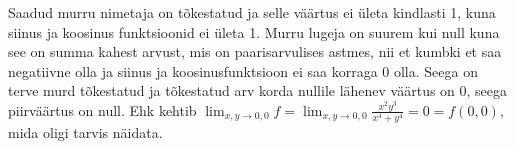 \documentclass{article}
\begin{document}
Saadud murru nimetaja on tõkestatud ja selle väärtus ei ületa kindlasti 1, kuna siinus ja koosinus funktsioonid ei ületa 1. Murru lugeja on suurem kui null kuna see on summa kahest arvust, mis on paarisarvulises astmes, nii et kumbki et saa negatiivne olla ja siinus ja koosinusfunktsioon ei saa korraga 0 olla. Seega on terve murd tõkestatud ja tõkestatud arv korda nullile lähenev väärtus on 0, seega piirväärtus on null. Ehk kehtib $\lim_{x,y\to 0,0}f=\lim_{x,y\to 0,0}\frac{x^2y^3}{x^4+y^4}=0=f(0,0)$, mida oligi tarvis näidata.
\end{document}

